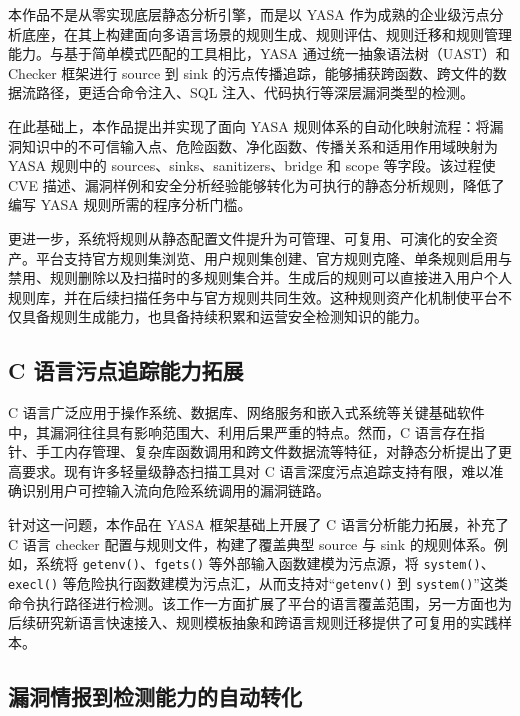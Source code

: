 \documentclass[a4paper,12pt,UTF8]{ctexart}
\numberwithin{figure}{section}
\numberwithin{table}{section}
\numberwithin{equation}{section}
\begin{document}
{\songti
本作品不是从零实现底层静态分析引擎，而是以 YASA 作为成熟的企业级污点分析底座，在其上构建面向多语言场景的规则生成、规则评估、规则迁移和规则管理能力。与基于简单模式匹配的工具相比，YASA 通过统一抽象语法树（UAST）和 Checker 框架进行 source 到 sink 的污点传播追踪，能够捕获跨函数、跨文件的数据流路径，更适合命令注入、SQL 注入、代码执行等深层漏洞类型的检测。

在此基础上，本作品提出并实现了面向 YASA 规则体系的自动化映射流程：将漏洞知识中的不可信输入点、危险函数、净化函数、传播关系和适用作用域映射为 YASA 规则中的 sources、sinks、sanitizers、bridge 和 scope 等字段。该过程使 CVE 描述、漏洞样例和安全分析经验能够转化为可执行的静态分析规则，降低了编写 YASA 规则所需的程序分析门槛。

更进一步，系统将规则从静态配置文件提升为可管理、可复用、可演化的安全资产。平台支持官方规则集浏览、用户规则集创建、官方规则克隆、单条规则启用与禁用、规则删除以及扫描时的多规则集合并。生成后的规则可以直接进入用户个人规则库，并在后续扫描任务中与官方规则共同生效。这种规则资产化机制使平台不仅具备规则生成能力，也具备持续积累和运营安全检测知识的能力。
\par}

\subsection{C 语言污点追踪能力拓展}

{\songti
C 语言广泛应用于操作系统、数据库、网络服务和嵌入式系统等关键基础软件中，其漏洞往往具有影响范围大、利用后果严重的特点。然而，C 语言存在指针、手工内存管理、复杂库函数调用和跨文件数据流等特征，对静态分析提出了更高要求。现有许多轻量级静态扫描工具对 C 语言深度污点追踪支持有限，难以准确识别用户可控输入流向危险系统调用的漏洞链路。

针对这一问题，本作品在 YASA 框架基础上开展了 C 语言分析能力拓展，补充了 C 语言 checker 配置与规则文件，构建了覆盖典型 source 与 sink 的规则体系。例如，系统将 \texttt{getenv()}、\texttt{fgets()} 等外部输入函数建模为污点源，将 \texttt{system()}、\texttt{execl()} 等危险执行函数建模为污点汇，从而支持对“\texttt{getenv()} 到 \texttt{system()}”这类命令执行路径进行检测。该工作一方面扩展了平台的语言覆盖范围，另一方面也为后续研究新语言快速接入、规则模板抽象和跨语言规则迁移提供了可复用的实践样本。
\par}

\subsection{漏洞情报到检测能力的自动转化}
\end{document}

